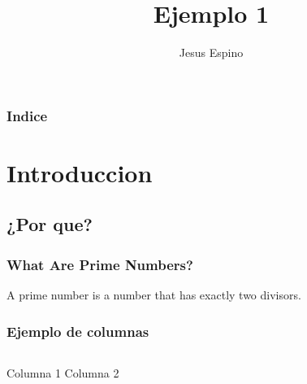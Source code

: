 \documentclass{beamer}
\title{Ejemplo 1}
\author{Jesus Espino}
\begin{document}
\begin{frame}
  \titlepage
\end{frame}

\begin{frame}
  \frametitle{Indice}
  \tableofcontents[pausesections]
\end{frame}

\section{Introduccion}
\subsection{¿Por que?}

\begin{frame}
  \frametitle{What Are Prime Numbers?}
  A prime number is a number that has exactly two divisors.
\end{frame}

\begin{frame}
  \frametitle{Ejemplo de columnas}
  \begin{columns}
	Columna 1
	Columna 2
  \end{columns}
\end{frame}
\end{document}
